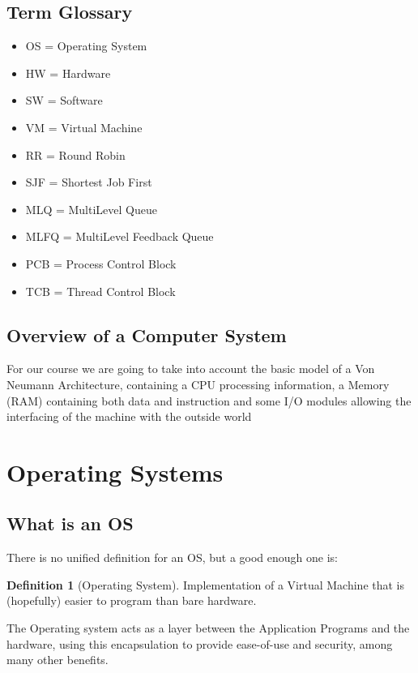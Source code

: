 \documentclass[openright, twoside]{report}
\theoremstyle{definition}
\newtheorem{definition}{Definition}[section]
\theoremstyle{example}
\begin{document}
	\subsection{Term Glossary}
	\begin{itemize}
		\item OS = Operating System
		\item HW = Hardware
		\item SW = Software
		\item VM = Virtual Machine
		\item RR = Round Robin
		\item SJF = Shortest Job First 
		\item MLQ = MultiLevel Queue 
		\item MLFQ = MultiLevel Feedback Queue
		\item PCB = Process Control Block 
		\item TCB = Thread Control Block
	\end{itemize}


	\subsection{Overview of a Computer System}

	For our course we are going to take into account the basic
	model of a Von Neumann Architecture, containing a CPU processing
	information, a Memory (RAM) containing both data and instruction
	and some I/O modules allowing the interfacing of the machine with the outside world


	\section{Operating Systems}
	\label{sec:OS}
	\subsection{What is an OS}
	There is no unified definition for an OS, but a good enough one is:

	\begin{definition}[Operating System]

		Implementation of a Virtual Machine that is (hopefully)
		easier to program than bare hardware.

	\end{definition}

	The Operating system acts as a layer between the Application
	Programs and the hardware, using this encapsulation to
	provide ease-of-use and security, among many other benefits.
\end{document}
